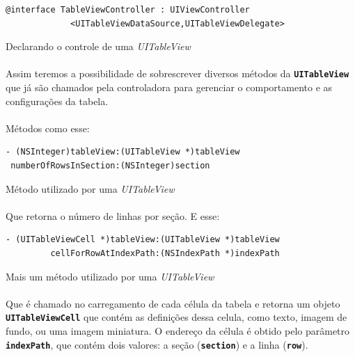\documentclass[a4paper,12pt,brazil,doubleside]{book}
\begin{document}
\begin{singlespace}
\begin{listing}[H]
\begin{verbatim}
@interface TableViewController : UIViewController
             <UITableViewDataSource,UITableViewDelegate>
\end{verbatim}
\caption{Declarando o controle de uma \emph{UITableView}}
\end{listing}

\paragraph{}Assim teremos a possibilidade de sobrescrever diversos métodos da \texttt{\textbf{UITableView}} que já são chamados pela controladora para gerenciar o comportamento e as configurações da tabela.
\paragraph{}Métodos como esse:

\begin{listing}
\begin{verbatim}
- (NSInteger)tableView:(UITableView *)tableView
 numberOfRowsInSection:(NSInteger)section
\end{verbatim}
\caption{Método utilizado por uma \emph{UITableView}}
\end{listing}

\paragraph{}Que retorna o número de linhas por seção. E esse:

\begin{listing}
\begin{verbatim}
- (UITableViewCell *)tableView:(UITableView *)tableView
         cellForRowAtIndexPath:(NSIndexPath *)indexPath
\end{verbatim}
\caption{Mais um método utilizado por uma \emph{UITableView}}
\end{listing}

\paragraph{}Que é chamado no carregamento de cada célula da tabela e retorna um objeto \texttt{\textbf{UITableViewCell}} que contém as definições dessa celula, como texto, imagem de fundo, ou uma imagem miniatura. O endereço da célula é obtido pelo parâmetro \texttt{\textbf{indexPath}}, que contém dois valores: a seção (\texttt{\textbf{section}}) e a linha (\texttt{\textbf{row}}).

\end{singlespace}
\end{document}
